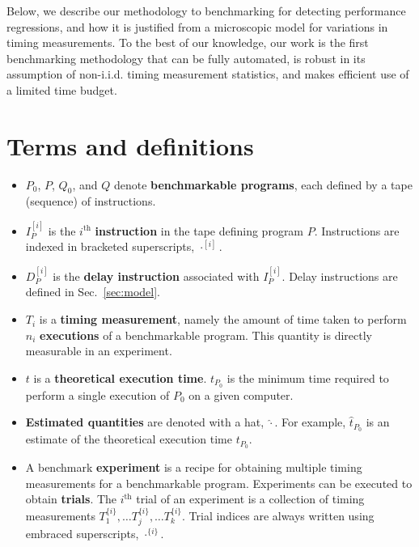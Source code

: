 \documentclass[conference]{IEEEtran}
\begin{document}
Below, we describe our methodology to benchmarking for detecting performance regressions,
and how it is justified from a microscopic model for variations in timing measurements. To
the best of our knowledge, our work is the first benchmarking methodology that can be fully
automated, is robust in its assumption of non-i.i.d. timing measurement statistics, and
makes efficient use of a limited time budget.

\section{Terms and definitions}
\label{sec:notation}

\begin{itemize}
    \item
    $P_0$, $P$, $Q_0$, and $Q$ denote \textbf{benchmarkable programs}, each
    defined by a tape (sequence) of instructions.

    \item
    $I^{[i]}_{P}$ is the $i^{\textrm{th}}$ \textbf{instruction} in the tape
    defining program $P$.
    Instructions are indexed in bracketed superscripts, $\cdot^{[i]}$.

    \item
    $D^{[i]}_{P}$ is the \textbf{delay instruction} associated with $I^{[i]}_{P}$.
    Delay instructions are defined in Sec.~\ref{sec:model}.

    \item
    $T_i$ is a \textbf{timing measurement}, namely the amount of time taken to
    perform $n_i$ \textbf{executions} of a benchmarkable program. This quantity
    is directly measurable in an experiment.

    \item
    $t$ is a \textbf{theoretical execution time}.
    $t_{P_0}$ is the minimum time required to perform a single execution of
    $P_0$ on a given computer.

    \item
    \textbf{Estimated quantities} are denoted with a hat, $\hat\cdot$.
    For example, $\hat{t}_{P_0}$ is an estimate of the theoretical execution
    time $t_{P_0}$.

    \item
    A benchmark \textbf{experiment} is a recipe for obtaining multiple timing
    measurements for a benchmarkable program. Experiments can be executed to
obtain \textbf{trials}. The
    $i^{\textrm{th}}$ trial of an experiment is a collection of timing measurements
    $T^{\{i\}}_1, \dots T^{\{i\}}_j, \dots T^{\{i\}}_k$. Trial indices are always
    written using embraced superscripts, $\cdot^{\{i\}}$.


\end{itemize}
\end{document}
